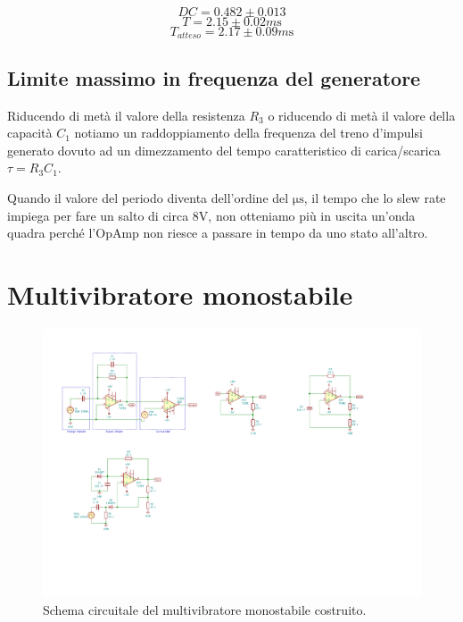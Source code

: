 \documentclass[10pt,a4paper]{article}
\begin{document}
\[
DC = 0.482 \pm 0.013
\]
\[
T = 2.15 \pm 0.02 \si{m\s}
\]
\[
T_{atteso} = 2.17 \pm 0.09 \si{m\s}
\]

\subsection{Limite massimo in frequenza del generatore}
Riducendo di metà il valore della resistenza $R_3$ o riducendo di metà il
valore della capacità $C_1$ notiamo un raddoppiamento della frequenza
del treno d'impulsi generato dovuto ad un dimezzamento del tempo
caratteristico di carica/scarica $\tau=R_3 C_1$.

Quando il valore del periodo diventa dell'ordine del $\si{\micro\s}$, il
tempo che lo slew rate impiega per fare un salto di circa $8$V, non
otteniamo più in uscita un'onda quadra perché l'OpAmp non riesce a passare
in tempo da uno stato all'altro.

\section{Multivibratore monostabile}
\begin{figure}[htbp]
    \centering
	\includegraphics[scale=1.2]{monostable}
    \caption{Schema circuitale del multivibratore monostabile costruito.
    \label{fig: monostableschm}}
\end{figure}
\end{document}
